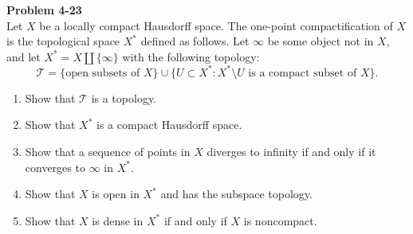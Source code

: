 \documentclass[12pt, a4paper]{article}
\theoremstyle{plain}
\newcommand{\T}{\mathcal{T}}
\newenvironment{problem}[2][Problem]
    { \begin{mdframed}[backgroundcolor=gray!20] \textbf{#1 #2} \\}
    {  \end{mdframed}}
\begin{document}
\begin{problem}{4-23}
    Let $X$ be a locally compact Hausdorff space. The one-point compactification of $X$ is the topological space $X^*$ defined as follows. Let $\infty$ be some object not in $X$, and let $X^* = X\coprod\{\infty\}$ with the following topology:
    \[
    \T = \{\textrm{open subsets of $X$}\}\cup \{U\subset X^*:X^*\setminus U \textrm{ is a compact subset of $X$}\}.
    \]
    \begin{enumerate}[label=(\alph*)]
        \item Show that $\T$ is a topology.
        \item Show that $X^*$ is a compact Hausdorff space.
        \item Show that a sequence of points in $X$ diverges to infinity if and only if it converges to $\infty$ in $X^*$.
        \item Show that $X$ is open in $X^*$ and has the subspace topology.
        \item Show that $X$ is dense in $X^*$ if and only if $X$ is noncompact.
    \end{enumerate}
\end{problem}
\end{document}
